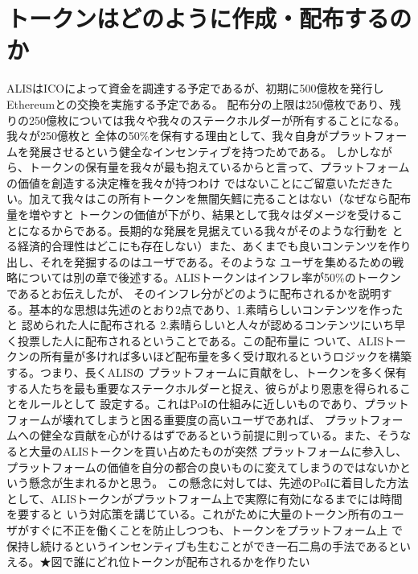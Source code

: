 \documentclass{jsarticle}
\begin{document}
\section{トークンはどのように作成・配布するのか}
ALISはICOによって資金を調達する予定であるが、初期に500億枚を発行しEthereumとの交換を実施する予定である。
配布分の上限は250億枚であり、残りの250億枚については我々や我々のステークホルダーが所有することになる。我々が250億枚と
全体の50\%を保有する理由として、我々自身がプラットフォームを発展させるという健全なインセンティブを持つためである。
しかしながら、トークンの保有量を我々が最も抱えているからと言って、プラットフォームの価値を創造する決定権を我々が持つわけ
ではないことにご留意いただきたい。加えて我々はこの所有トークンを無闇矢鱈に売ることはない（なぜなら配布量を増やすと
トークンの価値が下がり、結果として我々はダメージを受けることになるからである。長期的な発展を見据えている我々がそのような行動を
とる経済的合理性はどこにも存在しない）また、あくまでも良いコンテンツを作り出し、それを発掘するのはユーザである。そのような
ユーザを集めるための戦略については別の章で後述する。ALISトークンはインフレ率が50\%のトークンであるとお伝えしたが、
そのインフレ分がどのように配布されるかを説明する。基本的な思想は先述のとおり2点であり、1.素晴らしいコンテンツを作ったと
認められた人に配布される 2.素晴らしいと人々が認めるコンテンツにいち早く投票した人に配布されるということである。この配布量に
ついて、ALISトークンの所有量が多ければ多いほど配布量を多く受け取れるというロジックを構築する。つまり、長くALISの
プラットフォームに貢献をし、トークンを多く保有する人たちを最も重要なステークホルダーと捉え、彼らがより恩恵を得られることをルールとして
設定する。これはPoIの仕組みに近しいものであり、プラットフォームが壊れてしまうと困る重要度の高いユーザであれば、
プラットフォームへの健全な貢献を心がけるはずであるという前提に則っている。また、そうなると大量のALISトークンを買い占めたものが突然
プラットフォームに参入し、プラットフォームの価値を自分の都合の良いものに変えてしまうのではないかという懸念が生まれるかと思う。
この懸念に対しては、先述のPoIに着目した方法として、ALISトークンがプラットフォーム上で実際に有効になるまでには時間を要すると
いう対応策を講じている。これがために大量のトークン所有のユーザがすぐに不正を働くことを防止しつつも、トークンをプラットフォーム上
で保持し続けるというインセンティブも生むことができ一石二鳥の手法であるといえる。★図で誰にどれ位トークンが配布されるかを作りたい
\end{document}
